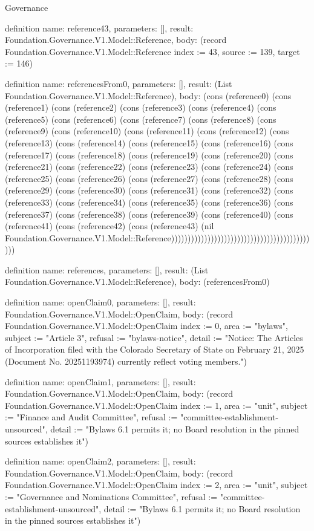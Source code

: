 \begin{lexlean}{Governance}
\begin{semanticmodule}
definition{
  name: reference43,
  parameters: [],
  result: Foundation.Governance.V1.Model::Reference,
  body: (record Foundation.Governance.V1.Model::Reference {index := 43, source := 139, target := 146})
}

definition{
  name: referencesFrom0,
  parameters: [],
  result: (List Foundation.Governance.V1.Model::Reference),
  body: (cons (reference0) (cons (reference1) (cons (reference2) (cons (reference3) (cons (reference4) (cons (reference5) (cons (reference6) (cons (reference7) (cons (reference8) (cons (reference9) (cons (reference10) (cons (reference11) (cons (reference12) (cons (reference13) (cons (reference14) (cons (reference15) (cons (reference16) (cons (reference17) (cons (reference18) (cons (reference19) (cons (reference20) (cons (reference21) (cons (reference22) (cons (reference23) (cons (reference24) (cons (reference25) (cons (reference26) (cons (reference27) (cons (reference28) (cons (reference29) (cons (reference30) (cons (reference31) (cons (reference32) (cons (reference33) (cons (reference34) (cons (reference35) (cons (reference36) (cons (reference37) (cons (reference38) (cons (reference39) (cons (reference40) (cons (reference41) (cons (reference42) (cons (reference43) (nil Foundation.Governance.V1.Model::Reference)))))))))))))))))))))))))))))))))))))))))))))
}

definition{
  name: references,
  parameters: [],
  result: (List Foundation.Governance.V1.Model::Reference),
  body: (referencesFrom0)
}

definition{
  name: openClaim0,
  parameters: [],
  result: Foundation.Governance.V1.Model::OpenClaim,
  body: (record Foundation.Governance.V1.Model::OpenClaim {index := 0, area := "bylaws", subject := "Article 3", refusal := "bylaws-notice", detail := "Notice: The Articles of Incorporation filed with the Colorado Secretary of State on February 21, 2025 (Document No. 20251193974) currently reflect voting members."})
}

definition{
  name: openClaim1,
  parameters: [],
  result: Foundation.Governance.V1.Model::OpenClaim,
  body: (record Foundation.Governance.V1.Model::OpenClaim {index := 1, area := "unit", subject := "Finance and Audit Committee", refusal := "committee-establishment-unsourced", detail := "Bylaws 6.1 permits it; no Board resolution in the pinned sources establishes it"})
}

definition{
  name: openClaim2,
  parameters: [],
  result: Foundation.Governance.V1.Model::OpenClaim,
  body: (record Foundation.Governance.V1.Model::OpenClaim {index := 2, area := "unit", subject := "Governance and Nominations Committee", refusal := "committee-establishment-unsourced", detail := "Bylaws 6.1 permits it; no Board resolution in the pinned sources establishes it"})
}


\end{semanticmodule}
\end{lexlean}
